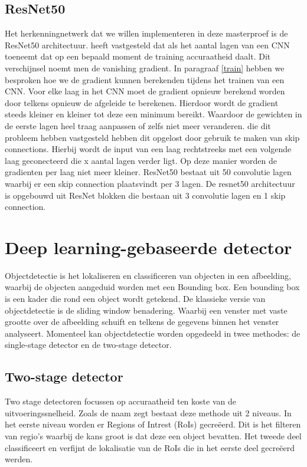 \subsection{ResNet50} \label{resnet}
Het herkenningnetwerk dat we willen implementeren in deze masterproef is de ResNet50 architectuur.
\cite{he2015deep} heeft vastgesteld dat als het aantal lagen van een CNN toeneemt dat op een bepaald moment de training accuraatheid daalt.
Dit verschijnsel noemt men de vanishing gradient.
In paragraaf \ref{train} hebben we besproken hoe we de gradient kunnen berekenden tijdens het trainen van een CNN.
Voor elke laag in het CNN moet de gradient opnieuw berekend worden door telkens opnieuw de afgeleide te berekenen.
Hierdoor wordt de gradient steeds kleiner en kleiner tot deze een minimum bereikt.
Waardoor de gewichten in de eerste lagen heel traag aanpassen of zelfs niet meer veranderen.
\cite{he2015deep} die dit probleem hebben vastgesteld hebben dit opgelost door gebruik te maken van skip connections.
Hierbij wordt de input van een laag rechtstreeks met een volgende laag geconecteerd die x aantal lagen verder ligt.
Op deze manier worden de gradienten per laag niet meer kleiner.
ResNet50 bestaat uit 50 convolutie lagen waarbij er een skip connection plaatsvindt per 3 lagen.
De resnet50 architectuur is opgebouwd uit ResNet blokken die bestaan uit 3 convolutie lagen en 1 skip connection.

\section{Deep learning-gebaseerde detector}
Objectdetectie is het lokaliseren en classificeren van objecten in een afbeelding, waarbij de objecten aangeduid worden met een Bounding box.
Een bounding box is een kader die rond een object wordt getekend. 
De klassieke versie van objectdetectie is de sliding window benadering.
Waarbij een venster met vaste grootte over de afbeelding schuift en telkens de gegevens binnen het venster analyseert.
Momenteel kan objectdetectie worden opgedeeld in twee methodes: de single-stage detector en de two-stage detector.

\subsection{Two-stage detector}
Two stage detectoren focussen op accuraatheid ten koste van de uitvoeringssnelheid.
Zoals de naam zegt bestaat deze methode uit 2 niveaus. 
In het eerste niveau worden er Regions of Intrest (RoIs) gecre\"eerd.
Dit is het filteren van regio's waarbij de kans groot is dat deze een object bevatten. 
Het tweede deel classificeert en verfijnt de lokalisatie van de RoIs die in het eerste deel gecre\"eerd werden. 

